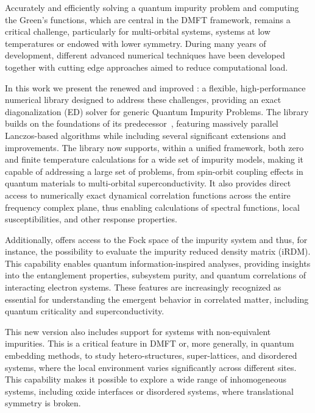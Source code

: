 \documentclass[edipack_sp.tex]{subfiles}
\begin{document}
Accurately and efficiently solving a quantum impurity problem and computing the Green's functions, which are central in the DMFT framework, remains a
critical challenge, particularly for multi-orbital systems, systems
at low temperatures or endowed with lower symmetry. During many years of development, different advanced numerical techniques have been developed together with cutting edge approaches aimed to reduce computational load.  

In this work we present the renewed and improved \NAME{}: a flexible, high-performance numerical library designed to address these challenges, providing an exact diagonalization (ED) solver for generic Quantum Impurity Problems. 
The library builds on the foundations of
its predecessor~\cite{amaricci2022CPC}, featuring massively parallel Lanczos-based algorithms while including several significant extensions and improvements. The library now supports, within a unified framework, both zero and finite temperature calculations for a wide set of impurity models, making it capable of addressing a large set of problems, from spin-orbit coupling effects in quantum materials to multi-orbital superconductivity. It also provides direct
access to numerically exact
dynamical correlation functions across the
entire frequency complex plane, thus enabling calculations of spectral functions, local susceptibilities, and other response properties.

Additionally, \NAME offers access to the Fock space of
the impurity system and thus, for instance, the possibility to evaluate the impurity reduced density matrix
(iRDM). This capability enables quantum information-inspired analyses, providing insights into the entanglement properties, subsystem purity, and quantum correlations of interacting electron systems. These
features are increasingly recognized as essential for understanding the emergent behavior in correlated matter, including quantum criticality and superconductivity.

This new version also includes support for systems with non-equivalent impurities. This is a critical feature in DMFT or, more generally, in quantum embedding methods, to study hetero-structures, super-lattices, and disordered systems, where the local environment varies significantly across different sites. This capability makes it 
possible to explore a wide range of inhomogeneous systems, including
oxide interfaces or disordered systems, where
translational symmetry is broken.
\end{document}
